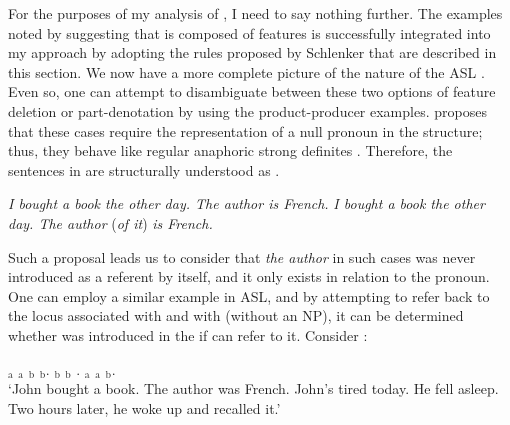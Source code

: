 \documentclass[output=paper,
modfonts
]{langscibook}
\begin{document}
For the purposes of my analysis of , I need to say nothing further. The examples noted by \citeauthor{Kuhn2015} suggesting that  is composed of features is successfully integrated into my approach by adopting the rules proposed by Schlenker that are described in this section. We now have a more complete picture of the nature of the ASL . Even so, one can attempt to disambiguate between these two options of feature deletion or part-denotation by using the product-producer  examples. \citet{Schwarz2009} proposes that these cases require the representation of a null pronoun in the structure; thus, they behave like regular anaphoric strong definites \citep[268]{Schwarz2009}. Therefore, the sentences in  are structurally understood as . 

\begin{exe}
	\ex 
	\begin{xlist} 
		\ex \label{ex:irani:81a} \textit{I bought a book the other day. The author is French.}
		\ex \label{ex:irani81b} \textit{I bought a book the other day. The author} (\textit{of it}) \textit{is French.}
	\end{xlist} 
\end{exe}

Such a proposal leads us to consider that \textit{the author} in such cases was never introduced as a referent by itself, and it only exists in relation to the pronoun. One can employ a similar example in ASL, and by attempting to refer back to the locus associated with  and  with  (without an NP), it can be determined whether  was introduced in the  if  can refer to it. Consider :


\begin{exe}  
	\ex \label{ex:irani:82} $_\text{a}$ $_\text{a}$  $_\text{b}$ $_\text{b}$. $_\text{b}$ $_\text{b}$ . $_\text{a}$ $_\text{a}$  $_\text{b}$. \\
	`John bought a book. The author was French. John's tired today. He fell asleep. Two hours later, he woke up and recalled it.'
\end{exe} 
\end{document}
